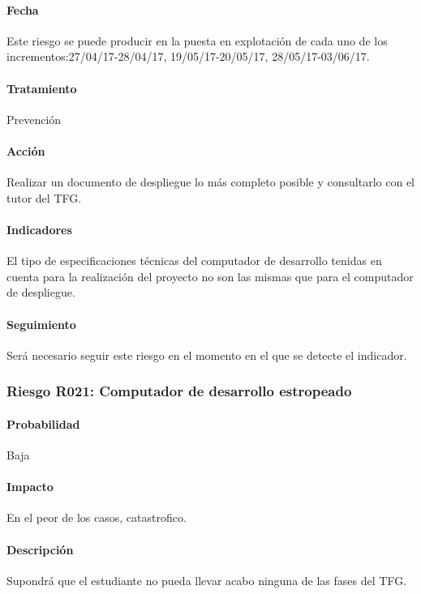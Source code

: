 \documentclass[10pt,a4paper]{article}
\begin{document}
				\paragraph{Fecha} Este riesgo se puede producir en la puesta en explotación de cada uno de los incrementos:27/04/17-28/04/17, 19/05/17-20/05/17, 28/05/17-03/06/17. %
				\paragraph{Tratamiento} Prevención %
				\paragraph{Acción} Realizar un documento de despliegue lo más completo posible y consultarlo con el tutor del TFG. %
				\paragraph{Indicadores} El tipo de  especificaciones técnicas del computador de desarrollo tenidas en cuenta para la realización del proyecto no son las mismas que para el computador de despliegue.  %
				\paragraph{Seguimiento}	Será necesario seguir este riesgo en el momento en el que se detecte el indicador.%
				
			\subsubsection{Riesgo R021: Computador de desarrollo estropeado }
				\paragraph{Probabilidad} Baja
				\paragraph{Impacto}	En el peor de los casos, catastrofico.
				\paragraph{Descripción} Supondrá que el estudiante no pueda llevar acabo ninguna de las fases del TFG.
\end{document}
